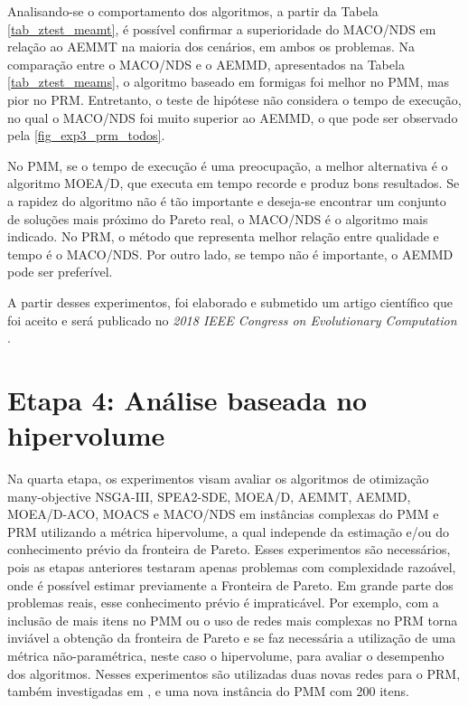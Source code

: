 Analisando-se o comportamento dos algoritmos, a partir da Tabela \ref{tab_ztest_meamt}, é possível confirmar a superioridade do MACO/NDS em relação ao AEMMT na maioria dos cenários, em ambos os problemas. Na comparação entre o MACO/NDS e o AEMMD, apresentados na Tabela \ref{tab_ztest_meams}, o algoritmo baseado em formigas foi melhor no PMM, mas pior no PRM. Entretanto, o teste de hipótese não considera o tempo de execução, no qual o MACO/NDS foi muito superior ao AEMMD, o que pode ser observado pela \autoref{fig_exp3_prm_todos}.

No PMM, se o tempo de execução é uma preocupação, a melhor alternativa é o algoritmo MOEA/D, que executa em tempo recorde e produz bons resultados. Se a rapidez do algoritmo não é tão importante e deseja-se encontrar um conjunto de soluções mais próximo do Pareto real, o MACO/NDS é o algoritmo mais indicado. No PRM, o método que representa melhor relação entre qualidade e tempo é o MACO/NDS. Por outro lado, se tempo não é importante, o AEMMD pode ser preferível.

A partir desses experimentos, foi elaborado e submetido um artigo científico que foi aceito e será publicado no \textit{2018 IEEE Congress on Evolutionary Computation} \cite{Franca2018}.

\section{Etapa 4: Análise baseada no hipervolume}
\label{section_experimentos_etapa4}

Na quarta etapa, os experimentos visam avaliar os algoritmos de otimização many-objective NSGA-III, SPEA2-SDE, MOEA/D, AEMMT, AEMMD, MOEA/D-ACO, MOACS e MACO/NDS em instâncias complexas do PMM e PRM utilizando a métrica hipervolume, a qual independe da estimação e/ou do conhecimento prévio da fronteira de Pareto. Esses experimentos são necessários, pois as etapas anteriores testaram apenas problemas com complexidade razoável, onde é possível estimar previamente a Fronteira de Pareto. Em grande parte dos problemas reais, esse conhecimento prévio é impraticável. Por exemplo, com a inclusão de mais itens no PMM ou o uso de redes mais complexas no PRM torna inviável a obtenção da fronteira de Pareto e se faz necessária a utilização de uma métrica não-paramétrica, neste caso o hipervolume, para avaliar o desempenho dos algoritmos. Nesses experimentos são utilizadas duas novas redes para o PRM, também investigadas em \cite{LafetaThesis}, e uma nova instância do PMM com 200 itens.

